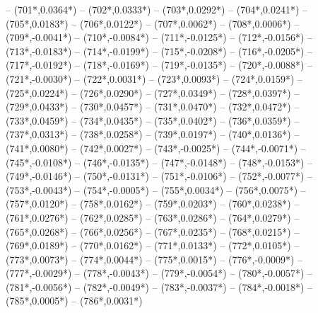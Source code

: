 {		-- ({701*\dx},{0.0364*\dy})
		-- ({702*\dx},{0.0333*\dy})
		-- ({703*\dx},{0.0292*\dy})
		-- ({704*\dx},{0.0241*\dy})
		-- ({705*\dx},{0.0183*\dy})
		-- ({706*\dx},{0.0122*\dy})
		-- ({707*\dx},{0.0062*\dy})
		-- ({708*\dx},{0.0006*\dy})
		-- ({709*\dx},{-0.0041*\dy})
		-- ({710*\dx},{-0.0084*\dy})
		-- ({711*\dx},{-0.0125*\dy})
		-- ({712*\dx},{-0.0156*\dy})
		-- ({713*\dx},{-0.0183*\dy})
		-- ({714*\dx},{-0.0199*\dy})
		-- ({715*\dx},{-0.0208*\dy})
		-- ({716*\dx},{-0.0205*\dy})
		-- ({717*\dx},{-0.0192*\dy})
		-- ({718*\dx},{-0.0169*\dy})
		-- ({719*\dx},{-0.0135*\dy})
		-- ({720*\dx},{-0.0088*\dy})
		-- ({721*\dx},{-0.0030*\dy})
		-- ({722*\dx},{0.0031*\dy})
		-- ({723*\dx},{0.0093*\dy})
		-- ({724*\dx},{0.0159*\dy})
		-- ({725*\dx},{0.0224*\dy})
		-- ({726*\dx},{0.0290*\dy})
		-- ({727*\dx},{0.0349*\dy})
		-- ({728*\dx},{0.0397*\dy})
		-- ({729*\dx},{0.0433*\dy})
		-- ({730*\dx},{0.0457*\dy})
		-- ({731*\dx},{0.0470*\dy})
		-- ({732*\dx},{0.0472*\dy})
		-- ({733*\dx},{0.0459*\dy})
		-- ({734*\dx},{0.0435*\dy})
		-- ({735*\dx},{0.0402*\dy})
		-- ({736*\dx},{0.0359*\dy})
		-- ({737*\dx},{0.0313*\dy})
		-- ({738*\dx},{0.0258*\dy})
		-- ({739*\dx},{0.0197*\dy})
		-- ({740*\dx},{0.0136*\dy})
		-- ({741*\dx},{0.0080*\dy})
		-- ({742*\dx},{0.0027*\dy})
		-- ({743*\dx},{-0.0025*\dy})
		-- ({744*\dx},{-0.0071*\dy})
		-- ({745*\dx},{-0.0108*\dy})
		-- ({746*\dx},{-0.0135*\dy})
		-- ({747*\dx},{-0.0148*\dy})
		-- ({748*\dx},{-0.0153*\dy})
		-- ({749*\dx},{-0.0146*\dy})
		-- ({750*\dx},{-0.0131*\dy})
		-- ({751*\dx},{-0.0106*\dy})
		-- ({752*\dx},{-0.0077*\dy})
		-- ({753*\dx},{-0.0043*\dy})
		-- ({754*\dx},{-0.0005*\dy})
		-- ({755*\dx},{0.0034*\dy})
		-- ({756*\dx},{0.0075*\dy})
		-- ({757*\dx},{0.0120*\dy})
		-- ({758*\dx},{0.0162*\dy})
		-- ({759*\dx},{0.0203*\dy})
		-- ({760*\dx},{0.0238*\dy})
		-- ({761*\dx},{0.0276*\dy})
		-- ({762*\dx},{0.0285*\dy})
		-- ({763*\dx},{0.0286*\dy})
		-- ({764*\dx},{0.0279*\dy})
		-- ({765*\dx},{0.0268*\dy})
		-- ({766*\dx},{0.0256*\dy})
		-- ({767*\dx},{0.0235*\dy})
		-- ({768*\dx},{0.0215*\dy})
		-- ({769*\dx},{0.0189*\dy})
		-- ({770*\dx},{0.0162*\dy})
		-- ({771*\dx},{0.0133*\dy})
		-- ({772*\dx},{0.0105*\dy})
		-- ({773*\dx},{0.0073*\dy})
		-- ({774*\dx},{0.0044*\dy})
		-- ({775*\dx},{0.0015*\dy})
		-- ({776*\dx},{-0.0009*\dy})
		-- ({777*\dx},{-0.0029*\dy})
		-- ({778*\dx},{-0.0043*\dy})
		-- ({779*\dx},{-0.0054*\dy})
		-- ({780*\dx},{-0.0057*\dy})
		-- ({781*\dx},{-0.0056*\dy})
		-- ({782*\dx},{-0.0049*\dy})
		-- ({783*\dx},{-0.0037*\dy})
		-- ({784*\dx},{-0.0018*\dy})
		-- ({785*\dx},{0.0005*\dy})
		-- ({786*\dx},{0.0031*\dy})
}

